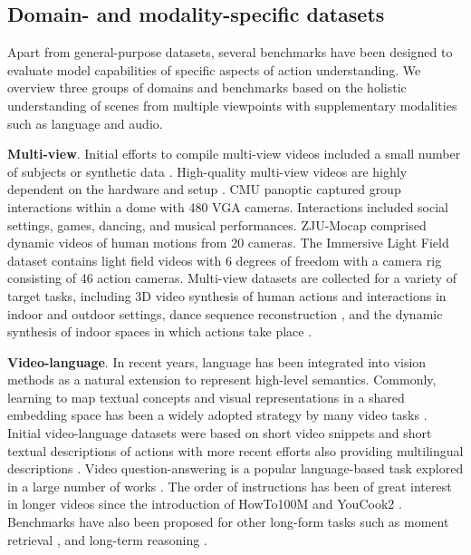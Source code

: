 \subsection{Domain- and modality-specific datasets}
\label{sec:datasets::specific}

Apart from general-purpose datasets, several benchmarks have been designed to evaluate model capabilities of specific aspects of action understanding. We overview three groups of domains and benchmarks based on the holistic understanding of scenes from multiple viewpoints with supplementary modalities such as language and audio.

\noindent
\textbf{Multi-view}. Initial efforts to compile multi-view videos included a small number of subjects \citep{sigal2010humaneva} or synthetic data \citep{ionescu2013human3}. High-quality multi-view videos are highly dependent on the hardware and setup \citep{wang2023learning}. CMU panoptic \citep{joo2017panoptic} captured group interactions within a dome with 480 VGA cameras. Interactions included social settings, games, dancing, and musical performances. ZJU-Mocap \citep{peng2021neural} comprised dynamic videos of human motions from 20 cameras. The Immersive Light Field dataset \citep{broxton2020immersive} contains light field videos with 6 degrees of freedom with a camera rig consisting of 46 action cameras. Multi-view datasets are collected for a variety of target tasks, including 3D video synthesis of human actions and interactions in indoor \citep{li2022neural} and outdoor \citep{lin2021deep,yoon2020novel} settings, dance sequence reconstruction \citep{tsuchida2019aist}, and the dynamic synthesis of indoor spaces in which actions take place \citep{tschernezki2024epic}.

\noindent
\textbf{Video-language}. In recent years, language has been integrated into vision methods as a natural extension to represent high-level semantics. Commonly, learning to map textual concepts and visual representations in a shared embedding space has been a widely adopted strategy by many video tasks \citep{amrani2021noise,gabeur2020multi,liu2019use,miech2020end}. Initial video-language datasets \citep{chen2011collecting,xu2016msr} were based on short video snippets and short textual descriptions of actions with more recent efforts also providing multilingual descriptions \citep{wang2019vatex}. Video question-answering is a popular language-based task explored in a large number of works \citep{jang2017tgif,lei2018tvqa,li2024mvbench,oncescu2021queryd,xiao2021next}. The order of instructions has been of great interest in longer videos since the introduction of HowTo100M \citep{miech2019howto100m} and YouCook2 \citep{zhou2018towards}. Benchmarks have also been proposed for other long-form tasks such as moment retrieval \citep{song2024moviechat,yang2024vidchapters}, and long-term reasoning \citep{mangalam2023egoschema}.

